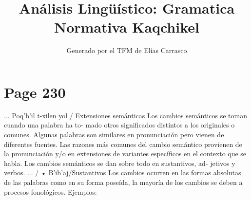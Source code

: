 \documentclass{article}%
\title{Análisis Lingüístico: Gramatica Normativa Kaqchikel}%
\author{Generado por el TFM de Elías Carrasco}%
\begin{document}
%
\normalsize%
\maketitle%
\section{Page 230}%
\label{sec:Page230}%
... Poq'b'il t{-}xilen yol / Extensiones semánticas %
Los cambios semánticos se toman cuando una palabra ha to{-} %
mado otros significados distintos a los originales o comunes. %
Algunas palabras son similares en pronunciación pero vienen %
de diferentes fuentes. %
Las razones más comunes del cambio semántico provienen de %
la pronunciación y/o en extensiones de variantes específicos %
en el contexto que se habla. %
Los cambios semánticos se dan sobre todo en sustantivos, ad{-} %
jetivos y verbos. %
... / • B'ib'aj/Sustantivos %
Los cambios ocurren en las formas absolutas de las palabras %
como en su forma poseída, la mayoría de los cambios se deben %
a procesos fonológicos. %
Ejemplos: 

%
\end{document}
